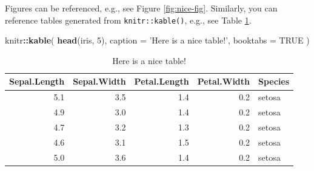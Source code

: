 \documentclass[openany]{book}
\newenvironment{Shaded}{\begin{snugshade}}{\end{snugshade}}
\newcommand{\KeywordTok}[1]{\textcolor[rgb]{0.13,0.29,0.53}{\textbf{#1}}}
\newcommand{\DataTypeTok}[1]{\textcolor[rgb]{0.13,0.29,0.53}{#1}}
\newcommand{\DecValTok}[1]{\textcolor[rgb]{0.00,0.00,0.81}{#1}}
\newcommand{\StringTok}[1]{\textcolor[rgb]{0.31,0.60,0.02}{#1}}
\newcommand{\OtherTok}[1]{\textcolor[rgb]{0.56,0.35,0.01}{#1}}
\newcommand{\OperatorTok}[1]{\textcolor[rgb]{0.81,0.36,0.00}{\textbf{#1}}}
\newcommand{\NormalTok}[1]{#1}
\begin{document}
Figures can be referenced, e.g., see Figure \ref{fig:nice-fig}.
Similarly, you can reference tables generated from
\texttt{knitr::kable()}, e.g., see Table \ref{tab:nice-tab}.

\begin{Shaded}
\begin{Highlighting}[]
\NormalTok{knitr}\OperatorTok{::}\KeywordTok{kable}\NormalTok{(}
  \KeywordTok{head}\NormalTok{(iris, }\DecValTok{5}\NormalTok{), }\DataTypeTok{caption =} \StringTok{'Here is a nice table!'}\NormalTok{,}
  \DataTypeTok{booktabs =} \OtherTok{TRUE}
\NormalTok{)}
\end{Highlighting}
\end{Shaded}

\begin{table}[t]

\caption{\label{tab:nice-tab}Here is a nice table!}
\centering
\begin{tabular}{rrrrl}
\toprule
Sepal.Length & Sepal.Width & Petal.Length & Petal.Width & Species\\
\midrule
5.1 & 3.5 & 1.4 & 0.2 & setosa\\
4.9 & 3.0 & 1.4 & 0.2 & setosa\\
4.7 & 3.2 & 1.3 & 0.2 & setosa\\
4.6 & 3.1 & 1.5 & 0.2 & setosa\\
5.0 & 3.6 & 1.4 & 0.2 & setosa\\
\bottomrule
\end{tabular}
\end{table}


\end{document}
